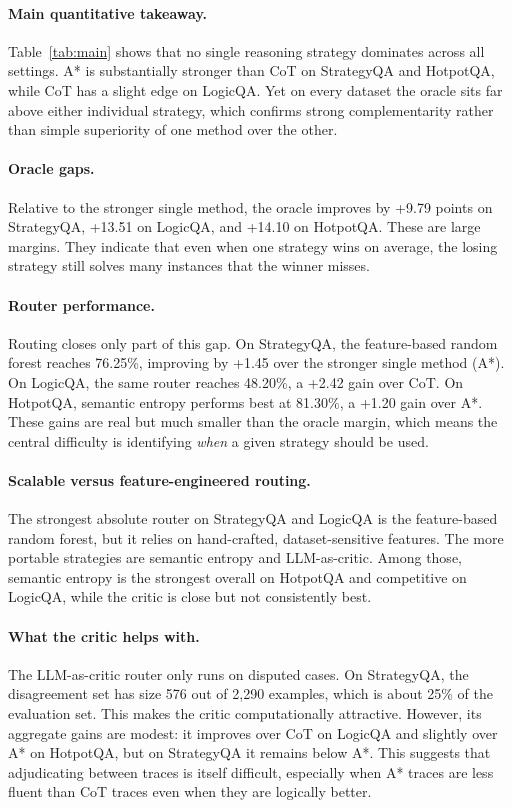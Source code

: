 \documentclass[11pt]{article}
\begin{document}
\paragraph{Main quantitative takeaway.}
Table~\ref{tab:main} shows that no single reasoning strategy dominates across all settings. A* is substantially stronger than CoT on StrategyQA and HotpotQA, while CoT has a slight edge on LogicQA. Yet on every dataset the oracle sits far above either individual strategy, which confirms strong complementarity rather than simple superiority of one method over the other.

\paragraph{Oracle gaps.}
Relative to the stronger single method, the oracle improves by +9.79 points on StrategyQA, +13.51 on LogicQA, and +14.10 on HotpotQA. These are large margins. They indicate that even when one strategy wins on average, the losing strategy still solves many instances that the winner misses.

\paragraph{Router performance.}
Routing closes only part of this gap. On StrategyQA, the feature-based random forest reaches 76.25\%, improving by +1.45 over the stronger single method (A*). On LogicQA, the same router reaches 48.20\%, a +2.42 gain over CoT. On HotpotQA, semantic entropy performs best at 81.30\%, a +1.20 gain over A*. These gains are real but much smaller than the oracle margin, which means the central difficulty is identifying \emph{when} a given strategy should be used.

\paragraph{Scalable versus feature-engineered routing.}
The strongest absolute router on StrategyQA and LogicQA is the feature-based random forest, but it relies on hand-crafted, dataset-sensitive features. The more portable strategies are semantic entropy and LLM-as-critic. Among those, semantic entropy is the strongest overall on HotpotQA and competitive on LogicQA, while the critic is close but not consistently best.

\paragraph{What the critic helps with.}
The LLM-as-critic router only runs on disputed cases. On StrategyQA, the disagreement set has size 576 out of 2{,}290 examples, which is about 25\% of the evaluation set. This makes the critic computationally attractive. However, its aggregate gains are modest: it improves over CoT on LogicQA and slightly over A* on HotpotQA, but on StrategyQA it remains below A*. This suggests that adjudicating between traces is itself difficult, especially when A* traces are less fluent than CoT traces even when they are logically better.
\end{document}
